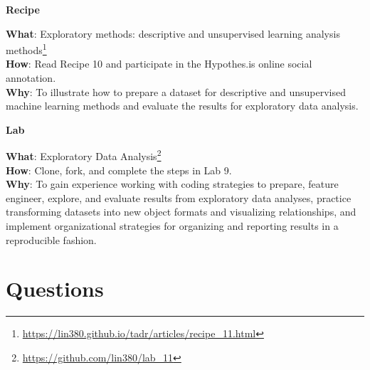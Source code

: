 \documentclass[
  letterpaper,
  DIV=11,
  numbers=noendperiod]{scrreport}
\theoremstyle{definition}
\theoremstyle{remark}
\DeclareRobustCommand{\href}[2]{#2\footnote{\url{#1}}}
\begin{document}

\begin{tcolorbox}[enhanced jigsaw, breakable, colback=white, rightrule=.15mm, arc=.35mm, left=2mm, toprule=.15mm, leftrule=.75mm, bottomrule=.15mm, opacityback=0]

\textbf{ Recipe}

\textbf{What}:
\href{https://lin380.github.io/tadr/articles/recipe_11.html}{Exploratory
methods: descriptive and unsupervised learning analysis methods}\\
\textbf{How}: Read Recipe 10 and participate in the Hypothes.is online
social annotation.\\
\textbf{Why}: To illustrate how to prepare a dataset for descriptive and
unsupervised machine learning methods and evaluate the results for
exploratory data analysis.

\end{tcolorbox}

\begin{tcolorbox}[enhanced jigsaw, breakable, colback=white, rightrule=.15mm, arc=.35mm, left=2mm, toprule=.15mm, leftrule=.75mm, bottomrule=.15mm, opacityback=0]

\textbf{ Lab}

\textbf{What}: \href{https://github.com/lin380/lab_11}{Exploratory Data
Analysis}\\
\textbf{How}: Clone, fork, and complete the steps in Lab 9.\\
\textbf{Why}: To gain experience working with coding strategies to
prepare, feature engineer, explore, and evaluate results from
exploratory data analyses, practice transforming datasets into new
object formats and visualizing relationships, and implement
organizational strategies for organizing and reporting results in a
reproducible fashion.

\end{tcolorbox}

\hypertarget{questions-7}{%
\section*{Questions}\label{questions-7}}

\end{document}
